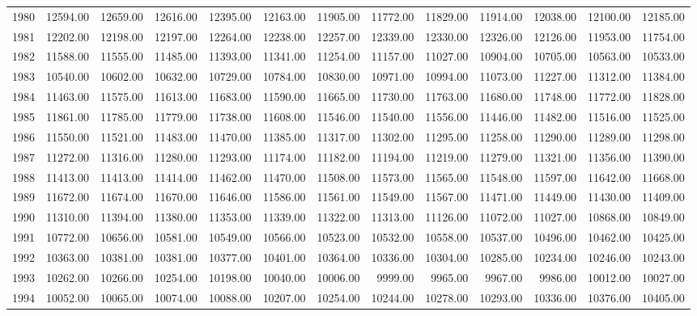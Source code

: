 \begin{longtable}{rrrrrrrrrrrrr}
  1980 & 12594.00 & 12659.00 & 12616.00 & 12395.00 & 12163.00 & 11905.00 & 11772.00 & 11829.00 & 11914.00 & 12038.00 & 12100.00 & 12185.00 \\ 
  1981 & 12202.00 & 12198.00 & 12197.00 & 12264.00 & 12238.00 & 12257.00 & 12339.00 & 12330.00 & 12326.00 & 12126.00 & 11953.00 & 11754.00 \\ 
  1982 & 11588.00 & 11555.00 & 11485.00 & 11393.00 & 11341.00 & 11254.00 & 11157.00 & 11027.00 & 10904.00 & 10705.00 & 10563.00 & 10533.00 \\ 
  1983 & 10540.00 & 10602.00 & 10632.00 & 10729.00 & 10784.00 & 10830.00 & 10971.00 & 10994.00 & 11073.00 & 11227.00 & 11312.00 & 11384.00 \\ 
  1984 & 11463.00 & 11575.00 & 11613.00 & 11683.00 & 11590.00 & 11665.00 & 11730.00 & 11763.00 & 11680.00 & 11748.00 & 11772.00 & 11828.00 \\ 
  1985 & 11861.00 & 11785.00 & 11779.00 & 11738.00 & 11608.00 & 11546.00 & 11540.00 & 11556.00 & 11446.00 & 11482.00 & 11516.00 & 11525.00 \\ 
  1986 & 11550.00 & 11521.00 & 11483.00 & 11470.00 & 11385.00 & 11317.00 & 11302.00 & 11295.00 & 11258.00 & 11290.00 & 11289.00 & 11298.00 \\ 
  1987 & 11272.00 & 11316.00 & 11280.00 & 11293.00 & 11174.00 & 11182.00 & 11194.00 & 11219.00 & 11279.00 & 11321.00 & 11356.00 & 11390.00 \\ 
  1988 & 11413.00 & 11413.00 & 11414.00 & 11462.00 & 11470.00 & 11508.00 & 11573.00 & 11565.00 & 11548.00 & 11597.00 & 11642.00 & 11668.00 \\ 
  1989 & 11672.00 & 11674.00 & 11670.00 & 11646.00 & 11586.00 & 11561.00 & 11549.00 & 11567.00 & 11471.00 & 11449.00 & 11430.00 & 11409.00 \\ 
  1990 & 11310.00 & 11394.00 & 11380.00 & 11353.00 & 11339.00 & 11322.00 & 11313.00 & 11126.00 & 11072.00 & 11027.00 & 10868.00 & 10849.00 \\ 
  1991 & 10772.00 & 10656.00 & 10581.00 & 10549.00 & 10566.00 & 10523.00 & 10532.00 & 10558.00 & 10537.00 & 10496.00 & 10462.00 & 10425.00 \\ 
  1992 & 10363.00 & 10381.00 & 10381.00 & 10377.00 & 10401.00 & 10364.00 & 10336.00 & 10304.00 & 10285.00 & 10234.00 & 10246.00 & 10243.00 \\ 
  1993 & 10262.00 & 10266.00 & 10254.00 & 10198.00 & 10040.00 & 10006.00 & 9999.00 & 9965.00 & 9967.00 & 9986.00 & 10012.00 & 10027.00 \\ 
  1994 & 10052.00 & 10065.00 & 10074.00 & 10088.00 & 10207.00 & 10254.00 & 10244.00 & 10278.00 & 10293.00 & 10336.00 & 10376.00 & 10405.00 \\ 

\end{longtable}
